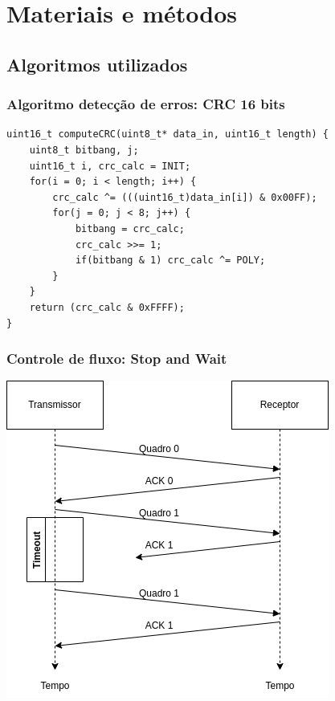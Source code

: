 \documentclass[12pt]{beamer}
\begin{document}
\section{Materiais e métodos}
\subsection{Algoritmos utilizados}

\begin{frame}[t,fragile]
    \frametitle{Algoritmo detecção de erros: CRC 16 bits}
\begin{lstlisting}[basicstyle=\small]
uint16_t computeCRC(uint8_t* data_in, uint16_t length) {
    uint8_t bitbang, j;
    uint16_t i, crc_calc = INIT;
    for(i = 0; i < length; i++) {
        crc_calc ^= (((uint16_t)data_in[i]) & 0x00FF);
        for(j = 0; j < 8; j++) {
            bitbang = crc_calc;
            crc_calc >>= 1;
            if(bitbang & 1) crc_calc ^= POLY;
        }
    }
    return (crc_calc & 0xFFFF);
}
\end{lstlisting}
\end{frame}

\begin{frame}
    \frametitle{Controle de fluxo: Stop and Wait}
    \centering
    \includegraphics[width=.68\textwidth]{stop_and_wait}
\end{frame}
\end{document}
